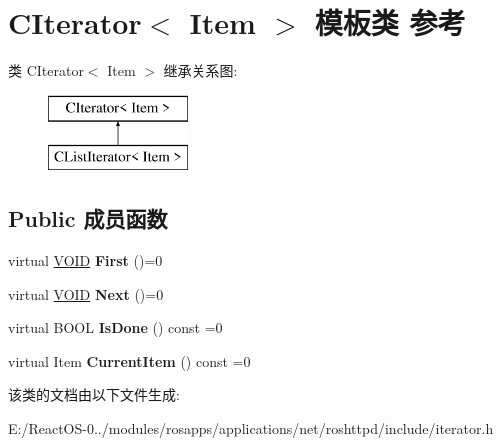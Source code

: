 \hypertarget{class_c_iterator}{}\section{C\+Iterator$<$ Item $>$ 模板类 参考}
\label{class_c_iterator}
类 C\+Iterator$<$ Item $>$ 继承关系图\+:\begin{figure}[H]
\begin{center}
\leavevmode
\includegraphics[height=2.000000cm]{class_c_iterator}
\end{center}
\end{figure}
\subsection*{Public 成员函数}
\begin{DoxyCompactItemize}
\item 
\mbox{\label{class_c_iterator_a1961dccfeae3f29dbeb887336b3ef42c}} 
virtual \hyperlink{interfacevoid}{V\+O\+ID} {\bfseries First} ()=0
\item 
\mbox{\label{class_c_iterator_a2dadfafcded104a41c43c4be2ec90565}} 
virtual \hyperlink{interfacevoid}{V\+O\+ID} {\bfseries Next} ()=0
\item 
\mbox{\label{class_c_iterator_a88c263a087fd373107d1ca4fe9c000a2}} 
virtual B\+O\+OL {\bfseries Is\+Done} () const =0
\item 
\mbox{\label{class_c_iterator_a1bab36734a0a7a75ff0d0ee5e9e1cee3}} 
virtual Item {\bfseries Current\+Item} () const =0
\end{DoxyCompactItemize}


该类的文档由以下文件生成\+:\begin{DoxyCompactItemize}
\item 
E\+:/\+React\+O\+S-\/0../modules/rosapps/applications/net/roshttpd/include/iterator.\+h\end{DoxyCompactItemize}
